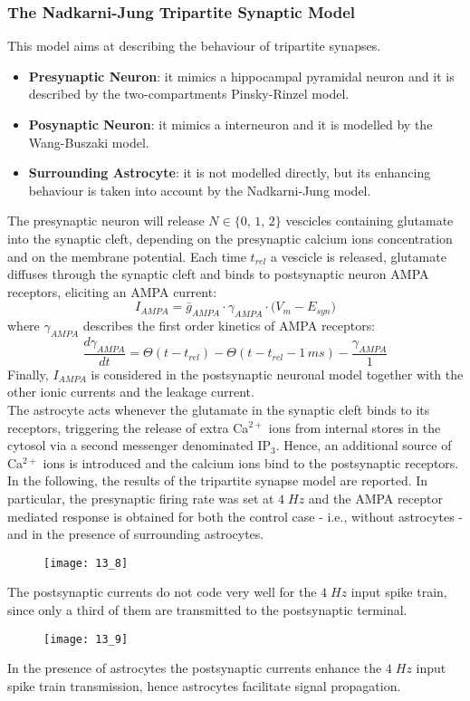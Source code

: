 \subsubsection{The Nadkarni-Jung Tripartite Synaptic Model}
This model aims at describing the behaviour of tripartite synapses.
\begin{itemize}
    \item \textbf{Presynaptic Neuron}: it mimics a hippocampal pyramidal neuron and it is
    described by the two-compartments Pinsky-Rinzel model.
    \item \textbf{Posynaptic Neuron}: it mimics a interneuron and it is modelled by the
    Wang-Buszaki model.
    \item \textbf{Surrounding Astrocyte}: it is not modelled directly, but its enhancing
    behaviour is taken into account by the Nadkarni-Jung model.
\end{itemize}
The presynaptic neuron will release \(N\in\bigl\{0,\,1,\,2\bigr\}\) vescicles
containing glutamate into the synaptic cleft, depending on the presynaptic calcium
ions concentration and on the membrane potential. Each time \(t_{rel}\) a vescicle is
released, glutamate diffuses through the synaptic cleft and binds to postsynaptic
neuron AMPA receptors, eliciting an AMPA current:
\begin{equation*}
    I_{AMPA}=\bar{g}_{AMPA}\cdot{\gamma_{AMPA}}\cdot{\bigl(V_{m}-E_{syn}\bigr)}
\end{equation*}
where \(\gamma_{AMPA}\) describes the first order kinetics of AMPA receptors:
\begin{equation*}
    \frac{d\gamma_{AMPA}}{dt}=\Theta(t-t_{rel})-\Theta(t-t_{rel}-1\,ms)-\frac{\gamma_{AMPA}}{1}
\end{equation*}
Finally, \(I_{AMPA}\) is considered in the postsynaptic neuronal model together with
the other ionic currents and the leakage current.\\
The astrocyte acts whenever the glutamate in the synaptic cleft binds to its
receptors, triggering the release of extra Ca\({}^{2+}\) ions from internal stores
in the cytosol via a second messenger denominated IP\({}_3\). Hence, an
additional source of Ca\({}^{2+}\) ions is introduced and the calcium ions bind to
the postsynaptic receptors.\\
In the following, the results of the tripartite synapse model are reported. In
particular, the presynaptic firing rate was set at \(4\;Hz\) and the AMPA receptor
mediated response is obtained for both the control case - i.e., without astrocytes -
and in the presence of surrounding astrocytes.
\begin{figure}[H]
    \texttt{[image: 13\_8]}
    \centering
\end{figure}
The postsynaptic currents do not code very well for the \(4\;Hz\) input spike train,
since only a third of them are transmitted to the postsynaptic terminal.
\begin{figure}[H]
    \texttt{[image: 13\_9]}
    \centering
\end{figure}
In the presence of astrocytes the postsynaptic currents enhance the \(4\;Hz\) input
spike train transmission, hence astrocytes facilitate signal propagation.